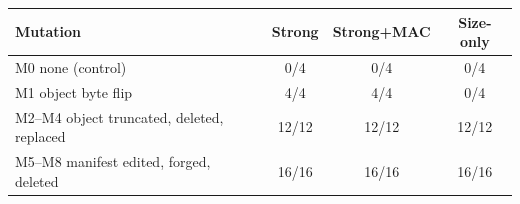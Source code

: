 
\begin{tabular}{@{}lccc@{}}
\toprule
Mutation & Strong & Strong+MAC & Size-only \\
\midrule
M0 none (control) & 0/4 & 0/4 & 0/4 \\
M1 object byte flip & 4/4 & 4/4 & 0/4 \\
M2--M4 object truncated, deleted, replaced & 12/12 & 12/12 & 12/12 \\
M5--M8 manifest edited, forged, deleted & 16/16 & 16/16 & 16/16 \\
\bottomrule
\end{tabular}
